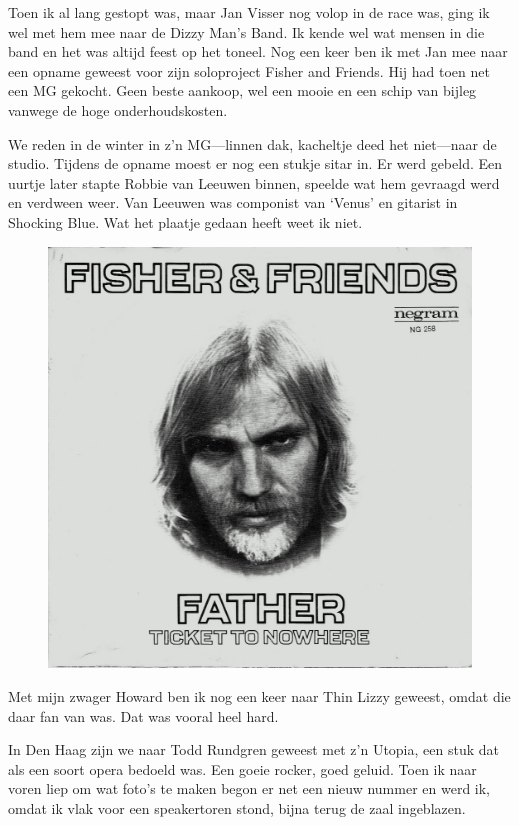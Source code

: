 \documentclass[10pt,twoside, openright]{memoir}
\begin{document}
Toen ik al lang gestopt was, maar Jan Visser nog volop in de race was, ging ik wel met hem mee naar de Dizzy Man's Band. Ik kende wel wat mensen in die band en het was altijd feest op het toneel. Nog een keer ben ik met Jan mee naar een opname geweest voor zijn soloproject Fisher and Friends. Hij had toen net een MG gekocht. Geen beste aankoop, wel een mooie en een schip van bijleg vanwege de hoge onderhoudskosten.

We reden in de winter in z’n MG---linnen dak, kacheltje deed het niet---naar de studio. Tijdens de opname moest er nog een stukje sitar in. Er werd gebeld. Een uurtje later stapte Robbie van Leeuwen binnen, speelde wat hem gevraagd werd en verdween weer. Van Leeuwen was componist van ‘Venus’ en gitarist in Shocking Blue. Wat het plaatje gedaan heeft weet ik niet.

\begin{figure}
\includegraphics[width=\textwidth]{img/ch31/ff}
\end{figure}

Met mijn zwager Howard ben ik nog een keer naar Thin Lizzy geweest, omdat die daar fan van was. Dat was vooral heel hard. 

In Den Haag zijn we naar Todd Rundgren geweest met z’n Utopia, een stuk dat als een soort opera bedoeld was. Een goeie rocker, goed geluid. Toen ik naar voren liep om wat foto's te maken begon er net een nieuw nummer en werd ik, omdat ik vlak voor een speakertoren stond, bijna terug de zaal ingeblazen.
\end{document}
